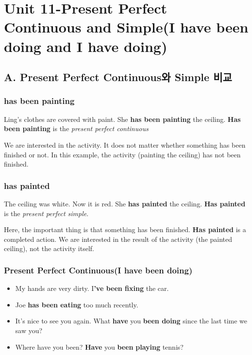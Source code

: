 \documentclass[11pt]{oblivoir}
\begin{document}
\section{Unit 11-Present Perfect Continuous and Simple(I have been doing and I have doing)}

\subsection{A. Present Perfect Continuous와 Simple 비교}
\subsubsection{has been painting}
Ling's clothes are covered with paint. 
She \textbf{has been painting} the ceiling.
\textbf{Has been painting} is the \textit{present perfect continuous}

We are interested in the activity. It does not matter whether something has been finished or not. In this example, the activity (painting the ceiling) has not been finished.

\subsubsection{has painted}
The ceiling was white. Now it is red. She \textbf{has painted} the ceiling. \newline
\textbf{Has painted} is the \textit{present perfect simple}. 

Here, the important thing is that something has been finished. \textbf{Has painted} is a completed action. We are interested in the result of the activity (the painted ceiling), not the activity itself.

\subsubsection{Present Perfect Continuous(I have been doing)}
\begin{itemize}
  \item My hands are very dirty. I\textbf{'ve been fixing} the car.
  \item Joe \textbf{has been eating} too much recently.
  \item It's nice to see you again. What \textbf{have} you \textbf{been doing} since the last time we saw you?
  \item Where have you been? \textbf{Have} you \textbf{been} \textbf{playing} tennis?
\end{itemize}
\end{document}
